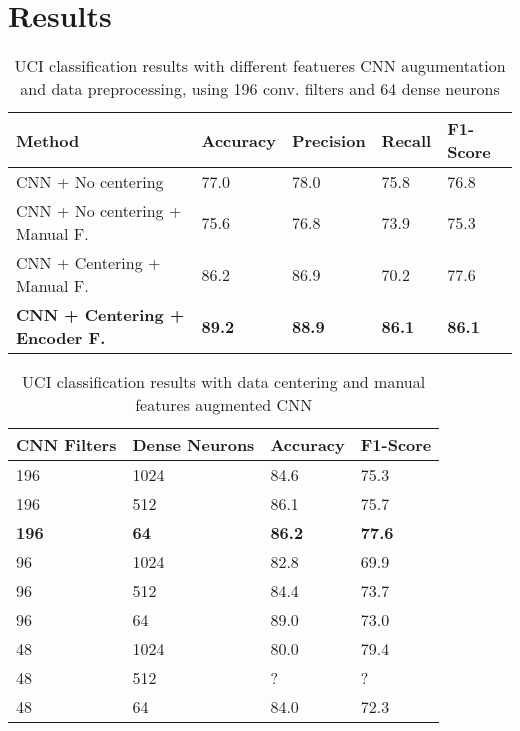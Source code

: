
\section{Results}
\label{sec:results}

\begin{table*}[t]
	\begin{center}
		\begin{tabular}{ p{7cm}p{2cm}p{2cm}p{2cm}p{2cm} } 
			\hline
			Method & Accuracy & Precision & Recall & F1-Score \\ 
			\hline
			CNN + No centering & 77.0 & 78.0 & 75.8 & 76.8 \\ 
			CNN + No centering + Manual F. & 75.6 & 76.8 & 73.9 & 75.3 \\
			CNN + Centering + Manual F. & 86.2 & 86.9 & 70.2 & 77.6 \\ 
			\textbf{CNN + Centering + Encoder F.} & \textbf{89.2} & \textbf{88.9} &  \textbf{86.1} & \textbf{86.1} \\ 
			\hline
		\end{tabular}
	\caption{\label{tab:model-performance} UCI classification results with different featueres CNN augumentation and data preprocessing, using 196 conv. filters and 64 dense neurons}
	\end{center}
\end{table*}

\begin{table}
	\begin{center}
		\begin{tabular}{ p{1.8cm}p{1.7cm}p{1.7cm}p{1.7cm} } 
			\hline
			CNN Filters & Dense Neurons & Accuracy & F1-Score \\ 
			\hline
			196 & 1024 & 84.6 & 75.3 \\
			196 & 512 & 86.1 & 75.7 \\ 
			\textbf{196} & \textbf{64} & \textbf{86.2} & \textbf{77.6} \\ 
			96 & 1024 & 82.8 & 69.9 \\
			96 & 512 & 84.4 & 73.7 \\ 
			96 & 64 & 89.0 & 73.0 \\  
			48 & 1024 & 80.0 & 79.4 \\
			48 & 512 & ? & ? \\ 
			48 & 64 & 84.0 & 72.3 \\
			\hline
		\end{tabular}
	\caption{\label{tab:model-selection} UCI classification results with data centering and manual features augmented CNN}
	\end{center}
\end{table}


